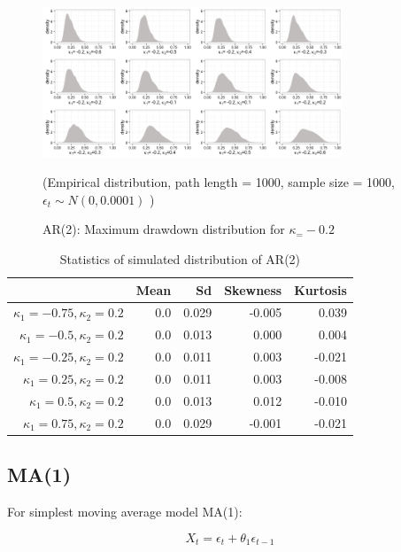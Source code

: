 \documentclass[11pt]{article}
\begin{document}
\begin{figure}[H]
\centering
\includegraphics[width = 0.8\textwidth]{../figures/simulation/AR2_maxDrawdown_dist_kappa1_-02}
\caption{AR(2): Maximum drawdown distribution for $\kappa_ = -0.2$}
(Empirical distribution, path length = 1000, sample size = 1000, $\epsilon_t \sim N(0, 0.0001)$ )
\label{fig:AR2_maxDrawdown_dist_kappa2_-02}
\end{figure}

\begin{table}[H]
\centering
\begin{tabular}{|r |r r r r|}
\hline
& Mean & Sd & Skewness & Kurtosis \\
\hline
$\kappa_1 = -0.75, \kappa_2 = 0.2$ & 0.0 & 0.029 & -0.005 & 0.039\\
$\kappa_1 = -0.5, \kappa_2 = 0.2$ & 0.0 & 0.013 & 0.000 & 0.004\\
$\kappa_1 = -0.25, \kappa_2 = 0.2$ & 0.0 & 0.011 & 0.003 & -0.021\\
$\kappa_1 = 0.25, \kappa_2 = 0.2$ & 0.0 &  0.011 & 0.003 & -0.008\\
$\kappa_1 = 0.5, \kappa_2 = 0.2$ & 0.0 & 0.013 & 0.012 & -0.010\\
$\kappa_1 = 0.75, \kappa_2 = 0.2$ & 0.0 &  0.029 & -0.001 & -0.021\\
\hline
\end{tabular}
\caption{Statistics of simulated distribution of AR(2)}
\label{table: AR2_return}
\end{table}

\subsection{MA(1)} %

For simplest moving average model MA(1):

\begin{equation}
X_t = \epsilon_t + \theta_1\epsilon_{t-1}
\end{equation}
\end{document}
